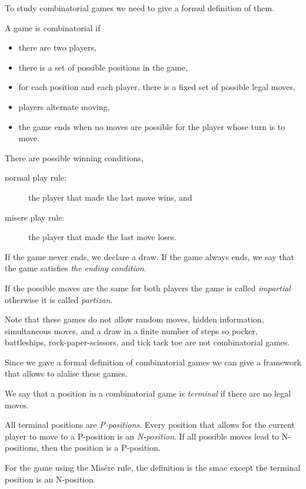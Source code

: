 To study combinatorial games we need to give a formul definition of them.
\begin{definition}
  A game is combinatorial if
  \begin{itemize}
    \item there are two players,
    \item there is a set of possible positions in the game,
    \item for each position and each player, there is a fixed set of possible
      legal moves,
    \item players alternate moving,
    \item the game ends when no moves are possible for the player whose
      turn is to move.
  \end{itemize}
  There are possible winning conditions,
  \begin{description}
    \item [normal play rule:] the player that made the last move wins, and
    \item [misere play rule:] the player that made the last move loses.
  \end{description}
  If the game never ends, we declare a draw. If the game always ends, we
  say that the game satisfies \emph{the ending condition}.

  If the possible moves are the same for both players the game is
  called \emph{impartial} otherwise it is called \emph{partizan}.
\end{definition}

Note that these games do not allow random moves, hidden information,
simultaneous moves, and a draw in a finite number of steps so
pocker, battleships, rock-paper-scissors, and tick tack toe are not
combinatorial games.

Since we gave a formal definition of combinatorial games we can give a framework
that allows to alalise these games.
\begin{definition}
  We say that a position in a combinatorial game is \emph{terminal} if there
  are no legal moves.

  All terminal positions are \emph{P-positions}. Every position that allows for
  the current player to move to a P-position is an \emph{N-position}. If all
  possible moves lead to N-positions, then the position is a P-position.

  For the game using the Mis\'ere rule, the definition is the smae except the
  terminal position is an N-position.
\end{definition}


